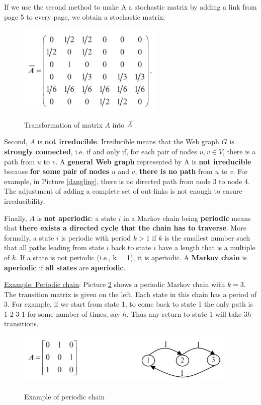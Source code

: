 If we use the second method to make A a stochastic matrix by adding a
link from page 5 to every page, we obtain a stochastic matrix:

\begin{figure}[h!]
		\centering
		\includegraphics[scale = 1.8]{img/dangling matrix 2.jpg}
		\label{dangling2}
        \caption{Transformation of matrix $A$ into $\Bar{A}$}
\end{figure}

Second, $A$ is \textbf{not irreducible}. Irreducible means that the Web graph $G$ is \textbf{strongly connected}, i.e. if and only if, for each pair of nodes $u,v \in V$, there is a path from $u$ to $v$. A \textbf{general Web graph} represented by A is \textbf{not irreducible} because \textbf{for some pair of nodes} $u$ and $v$, \textbf{there is no path} from $u$ to $v$. For example, in Picture \ref{dangling}, there is no directed path from node 3 to node 4. The adjustment of adding a complete set of out-links is not enough to ensure irreducibility. 

Finally, $A$ is \textbf{not aperiodic}: a state $i$ in a Markov chain being \textbf{periodic} means that \textbf{there exists a directed cycle that the chain has to traverse}. More formally, a state $i$ is periodic with period $k > 1$ if $k$ is the smallest number such that all paths leading from state $i$ back to state $i$ have a length that is a multiple of $k$. If a state is not periodic (i.e., k = 1), it is aperiodic. A \textbf{Markov chain} is \textbf{aperiodic} if \textbf{all states} are \textbf{aperiodic}. 

\underline{Example: Periodic chain}: Picture \ref{periodic chain} shows a periodic Markov chain with $k = 3$. The transition matrix is given on the left. Each state in this chain has a period of 3. For example, if we start from state 1, to come back to state 1 the only path is 1-2-3-1 for some number of times, say $h$. Thus any return to state 1 will take $3h$ transitions. 

\begin{figure}[h!]
		\centering
		\includegraphics[scale = 1.8]{img/periodic chain.jpg}
		\label{periodic chain}
        \caption{Example of periodic chain}
\end{figure}

